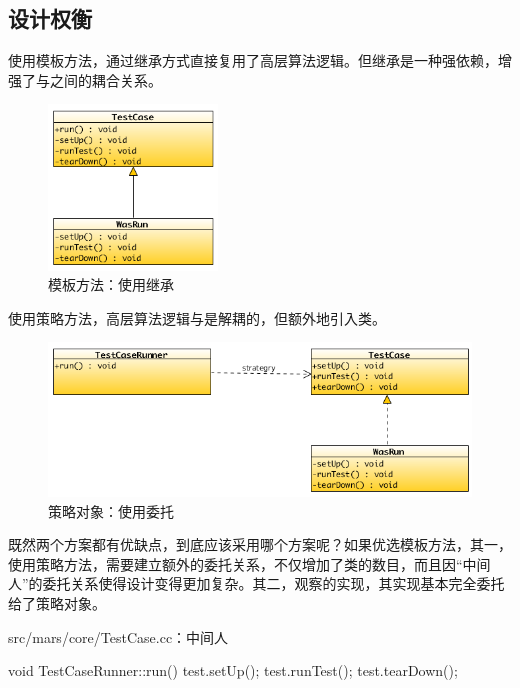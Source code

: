 \begin{content}
\subsection{设计权衡}

使用模板方法，通过继承方式直接复用了高层算法逻辑。但继承是一种强依赖，增强了与之间的耦合关系。

\begin{figure}[H]
\centering
\includegraphics[width=0.4\textwidth]{figures/xunit/simple-test.png}
\caption{模板方法：使用继承}
 \label{fig:simple-test}
\end{figure}

使用策略方法，高层算法逻辑与是解耦的，但额外地引入类。

\begin{figure}[H]
\centering
\includegraphics[width=1.0\textwidth]{figures/xunit/simple-test-strategry.png}
\caption{策略对象：使用委托}
 \label{fig:simple-test-strategry}
\end{figure}

既然两个方案都有优缺点，到底应该采用哪个方案呢？如果优选模板方法，其一，使用策略方法，需要建立额外的委托关系，不仅增加了类的数目，而且因“中间人”的委托关系使得设计变得更加复杂。其二，观察的实现，其实现基本完全委托给了策略对象。

\begin{nodiff}{src/mars/core/TestCase.cc：中间人}
\begin{c++}
void TestCaseRunner::run() {
  test.setUp();
  test.runTest();
  test.tearDown();
}
\end{c++}
\end{nodiff}


\end{content}
